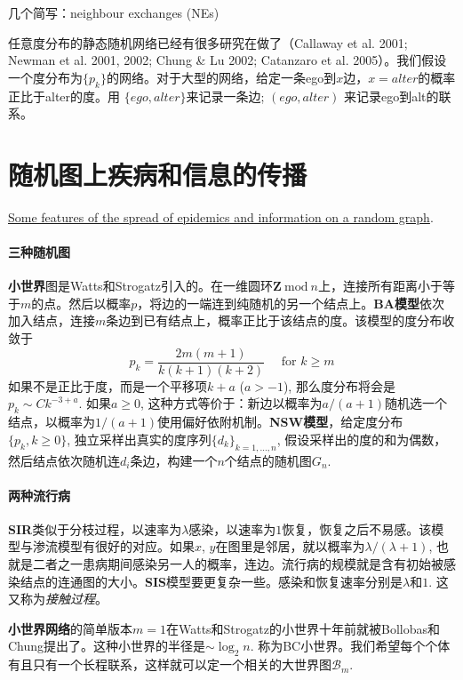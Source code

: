 几个简写：neighbour exchanges (NEs)

任意度分布的静态随机网络已经有很多研究在做了（Callaway et al. 2001; Newman et al. 2001, 2002; Chung \& Lu 2002; Catanzaro et al. 2005）。我们假设一个度分布为$\{p_k\}$的网络。对于大型的网络，给定一条ego到$x$边，$x=alter$的概率正比于alter的度。用 $\{ego, alter\}$来记录一条边; $(ego, alter)$ 来记录ego到alt的联系。

\section{随机图上疾病和信息的传播}

\href{https://www.pnas.org/content/pnas/107/10/4491.full.pdf}{Some features of the spread of epidemics and information on a random graph}. 

\paragraph{三种随机图}\textbf{小世界}图是Watts和Strogatz引入的。在一维圆环$\mathbf{Z} ~\text{mod}~n$上，连接所有距离小于等于$m$的点。然后以概率$p$，将边的一端连到纯随机的另一个结点上。\textbf{BA模型}依次加入结点，连接$m$条边到已有结点上，概率正比于该结点的度。该模型的度分布收敛于\begin{equation} p_{k}=\frac{2 m(m+1)}{k(k+1)(k+2)} \quad \text { for } k \geq m \end{equation}如果不是正比于度，而是一个平移项$k+a$ ($a>-1$), 那么度分布将会是$p_k\sim C k^{-3+a}$. 如果$a\geq 0$, 这种方式等价于：新边以概率为$a/(a+1)$随机选一个结点，以概率为$1/(a+1)$使用偏好依附机制。\textbf{NSW模型}，给定度分布$\{p_k,k\geq 0\}$, 独立采样出真实的度序列$\{d_k\}_{k=1,\dots, n}$, 假设采样出的度的和为偶数，然后结点依次随机连$d_i$条边，构建一个$n$个结点的随机图$G_n$. 

\paragraph{两种流行病}\textbf{SIR}类似于分枝过程，以速率为$\lambda$感染，以速率为$1$恢复，恢复之后不易感。该模型与渗流模型有很好的对应。如果$x$, $y$在图里是邻居，就以概率为$\lambda/(\lambda+1)$, 也就是二者之一患病期间感染另一人的概率，连边。流行病的规模就是含有初始被感染结点的连通图的大小。\textbf{SIS}模型要更复杂一些。感染和恢复速率分别是$\lambda$和$1$. 这又称为\textit{接触过程}。

\textbf{小世界网络}的简单版本$m=1$在Watts和Strogatz的小世界十年前就被Bollobas和Chung提出了。这种小世界的半径是$\sim\log_2 n$. 称为BC小世界。我们希望每个个体有且只有一个长程联系，这样就可以定一个相关的大世界图$\mathscr{B}_m$. 


